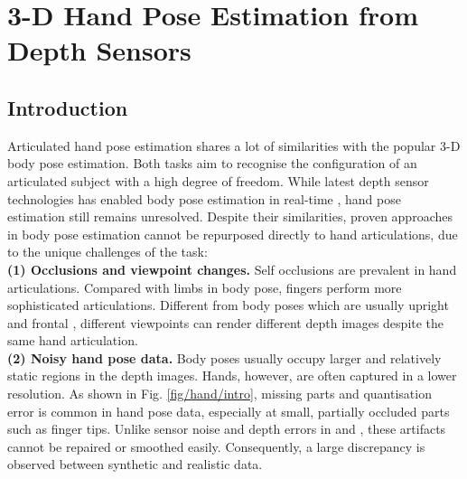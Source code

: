 \chapter{3-D Hand Pose Estimation from Depth Sensors}

\section{Introduction}
Articulated hand pose estimation shares a lot of similarities with the popular 3-D body pose estimation. 
Both tasks aim to recognise the configuration of an articulated subject with a high degree of freedom. 
While latest depth sensor technologies has enabled body pose estimation in real-time \cite{Baak2011, Shotton2011, Girshick2011, Sun2012}, hand pose estimation still remains unresolved.
Despite their similarities, proven approaches in body pose estimation cannot be repurposed directly to hand articulations, due to the unique challenges of the task:   \\
\textbf{(1) Occlusions and viewpoint changes.} Self occlusions are prevalent in hand articulations. %
Compared with limbs in body pose, fingers perform more sophisticated articulations. 
Different from body poses which are usually upright and frontal \cite{Eichner2012}, different viewpoints can render different depth images despite the same hand articulation. \\  
\textbf{(2) Noisy hand pose data.} Body poses usually occupy larger and relatively static regions in the depth images. 
Hands, however, are often captured in a lower resolution.
As shown in Fig. \ref{fig/hand/intro}, missing parts and quantisation error is common in hand pose data, especially at small, partially occluded parts such as finger tips. 
Unlike sensor noise and depth errors in \cite{Girshick2011} and \cite{Baak2011}, these artifacts cannot be repaired or smoothed easily. Consequently, a large discrepancy is observed between synthetic and realistic data. 

